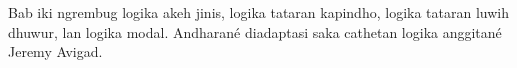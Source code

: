 \documentclass[../../../include/open-logic-chapter]{subfiles}
\begin{document}

\begin{editorial}
Bab iki ngrembug logika akeh jinis, logika tataran kapindho, logika tataran luwih dhuwur, lan logika modal. Andharané diadaptasi saka cathetan logika anggitané Jeremy Avigad.
\end{editorial}








\OLEndChapterHook
\end{document}
